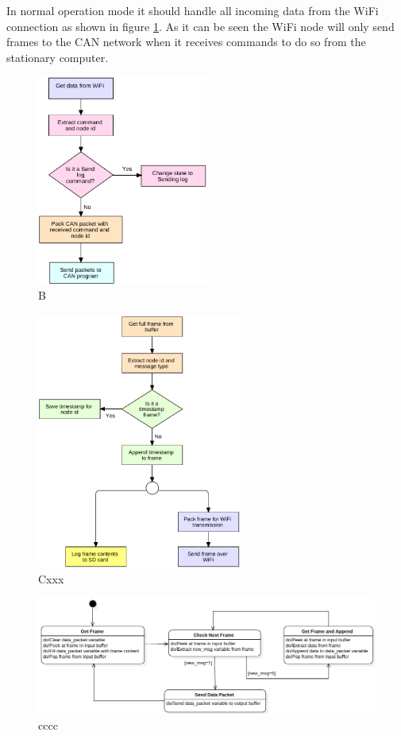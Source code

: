 In normal operation mode it should handle all incoming data from the WiFi connection as shown in figure \ref{fig:FlowChart_NodeWiFiCmd}.
As it can be seen the WiFi node will only send frames to the CAN network when it receives commands to do so from the stationary computer.
\begin{figure}[!h]
\centering
\includegraphics[width=0.5\textwidth]{graphics/FlowChart_NodeWiFiCmd}
\caption{B}
\label{fig:FlowChart_NodeWiFiCmd}
\end{figure}

\begin{figure}[!h]
\centering
\includegraphics[width=0.6\textwidth]{graphics/FlowChart_CANFrameProcess}
\caption{Cxxx}
\label{fig:FlowChart_CANFrameProcess}
\end{figure}


\begin{figure}[!h]
\centering
\includegraphics[width=1\textwidth]{graphics/StateDiagram_ConcatMsgProcess}
\caption{cccc}
\label{fig:StateDiagram_ConcatMsgProcess}
\end{figure}



